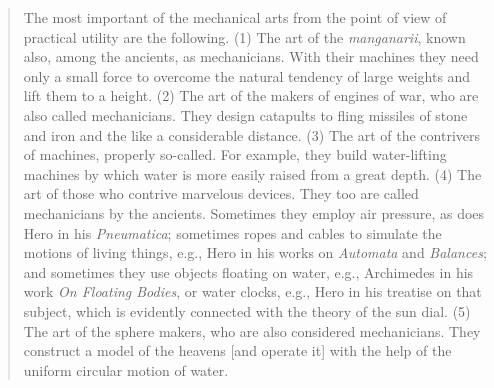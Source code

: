 \documentclass{article}
\begin{document}
\begin{quote}
The most important of the mechanical arts from the point of view
of practical utility are the following. (1) The art of the {\em manganarii},
known also, among the ancients, as mechanicians. With their machines
they need only a small force to overcome the natural tendency of large
weights and lift them to a height. (2) The art of the makers of engines
of war, who are also called mechanicians. They design catapults to fling
missiles of stone and iron and the like a considerable distance. (3) The
art of the contrivers of machines, properly so-called. For example, they
build water-lifting machines by which water is more easily raised from a
great depth. (4) The art of those who contrive marvelous devices. They
too are called mechanicians by the ancients. Sometimes they employ air
pressure, as does Hero in his {\em Pneumatica}; sometimes ropes and cables to
simulate the motions of living things, e.g., Hero in his works on {\em Automata}
and {\em Balances}; and sometimes they use objects floating on water, e.g.,
Archimedes in his work {\em On Floating Bodies}, or water clocks, e.g., Hero
in his treatise on that subject, which is evidently connected with the theory
of the sun dial. (5) The art of the sphere makers, who are also considered
mechanicians. They construct a model of the heavens [and operate it]
with the help of the uniform circular motion of water.


\end{quote}
\end{document}
